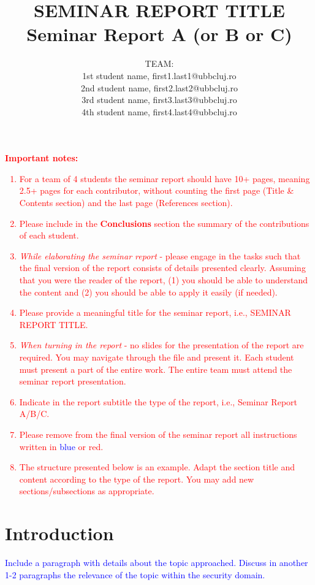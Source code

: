 \documentclass{article}
\title{\textbf{SEMINAR REPORT TITLE}\\
Seminar Report A (or B or C)}
\author{TEAM:\\
1st student name, first1.last1@ubbcluj.ro\\
2nd student name, first2.last2@ubbcluj.ro\\
3rd student name, first3.last3@ubbcluj.ro\\
4th student name, first4.last4@ubbcluj.ro
}
\begin{document}
\maketitle

\textcolor{red}{\textbf{Important notes:}
\begin{enumerate}
    \item For a team of 4 students the seminar report should have 10+ pages, meaning 2.5+ pages for each contributor, without counting the first page (Title \& Contents section) and the last page (References section).
    \item Please include in the \textbf{Conclusions} section the summary of the contributions of each student.
    \item \textit{While elaborating the seminar report} - please engage in the tasks such that the final version of the report consists of details presented clearly. Assuming that you were the reader of the report, (1) you should be able to understand the content and (2) you should be able to apply it easily (if needed).
    \item Please provide a meaningful title for the seminar report, i.e., SEMINAR REPORT TITLE.
    \item \textit{When turning in the report} - no slides for the presentation of the report are required. You may navigate through the file and present it. Each student must present a part of the entire work. The entire team must attend the seminar report presentation.
    \item Indicate in the report subtitle the type of the report, i.e., Seminar Report A/B/C.
    \item Please remove from the final version of the seminar report all instructions written in \textcolor{blue}{blue} or \textcolor{red}{red}.
    \item The structure presented below is an example. Adapt the section title and content according to the type of the report. You may add new sections/subsections as appropriate. 
\end{enumerate}
}

\tableofcontents

\newpage

\section{Introduction}
\label{label:Introduction}

\textcolor{blue}{Include a paragraph with details about the topic approached. Discuss in another 1-2 paragraphs the relevance of the topic within the security domain.
}
\end{document}
